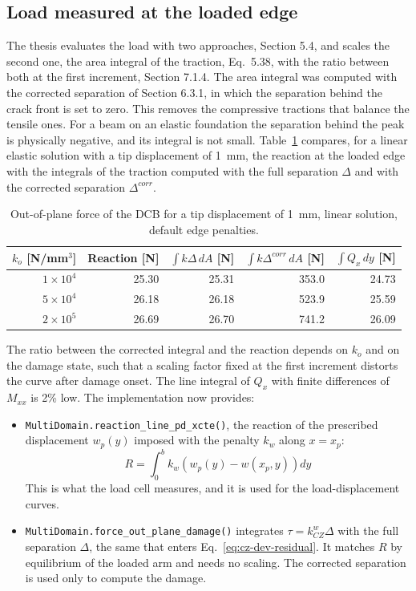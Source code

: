 \subsection{Load measured at the loaded edge}\label{sec:cz-dev-force}

The thesis evaluates the load with two approaches, Section 5.4, and scales the second one, the area integral of the traction, Eq.~5.38, with the ratio between both at the first increment, Section 7.1.4. The area integral was computed with the corrected separation of Section 6.3.1, in which the separation behind the crack front is set to zero. This removes the compressive tractions that balance the tensile ones. For a beam on an elastic foundation the separation behind the peak is physically negative, and its integral is not small. Table~\ref{tab:cz-dev-force} compares, for a linear elastic solution with a tip displacement of 1~mm, the reaction at the loaded edge with the integrals of the traction computed with the full separation $\Delta$ and with the corrected separation $\Delta^{corr}$.

\begin{table}[!htbp]
	\centering
	\caption[]{Out-of-plane force of the DCB for a tip displacement of 1~mm, linear solution, default edge penalties.}
	\label{tab:cz-dev-force}
	\renewcommand{\arraystretch}{1.3}
	\begin{tabular}{rrrrr}
		\toprule
		$k_o$ [N/mm$^3$] & Reaction [N] & $\int k \Delta \, dA$ [N] & $\int k \Delta^{corr} \, dA$ [N] & $\int Q_x \, dy$ [N] \\
		\midrule
		$1\times10^4$ & 25.30 & 25.31 & 353.0 & 24.73 \\
		$5\times10^4$ & 26.18 & 26.18 & 523.9 & 25.59 \\
		$2\times10^5$ & 26.69 & 26.70 & 741.2 & 26.09 \\
		\bottomrule
	\end{tabular}
\end{table}

The ratio between the corrected integral and the reaction depends on $k_o$ and on the damage state, such that a scaling factor fixed at the first increment distorts the curve after damage onset. The line integral of $Q_x$ with finite differences of $M_{xx}$ is 2\% low. The implementation now provides:

\begin{itemize}
	\item \texttt{MultiDomain.reaction\_line\_pd\_xcte()}, the reaction of the prescribed displacement $w_p(y)$ imposed with the penalty $k_w$ along $x = x_p$:
	\begin{equation}\label{eq:cz-dev-reaction}
		R = \int_0^b k_w \left( w_p(y) - w(x_p, y) \right) dy
	\end{equation}
	This is what the load cell measures, and it is used for the load-displacement curves.
	\item \texttt{MultiDomain.force\_out\_plane\_damage()} integrates $\tau = k^w_{CZ} \Delta$ with the full separation $\Delta$, the same that enters Eq.~\ref{eq:cz-dev-residual}. It matches $R$ by equilibrium of the loaded arm and needs no scaling. The corrected separation is used only to compute the damage.
\end{itemize}

